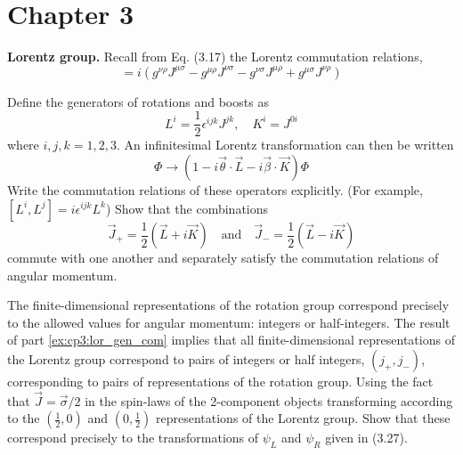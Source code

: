 \section{Chapter 3}

\setcounter{equation}{150}
\problem \textbf{Lorentz group.} Recall from Eq. (3.17) the Lorentz commutation relations,
\begin{equation*}
    [J^{\mu\nu}, J^{\rho\sigma}] = i(g^{\nu\rho}J^{\mu\sigma} - g^{\mu\rho}J^{\nu\sigma} - g^{\nu\sigma}J^{\mu\rho} + g^{\mu\sigma}J^{\nu\rho})
\end{equation*}
\begin{problembody}
    \item \label{ex:cp3:lor_gen_com} 
    Define the generators of rotations and boosts as
    \begin{equation*}
        L^i = \frac{1}{2}\epsilon^{ijk} J^{jk}, \quad K^i = J^{0i}
    \end{equation*}
    where $i, j, k = 1, 2, 3$. An infinitesimal Lorentz transformation can then be written
    \begin{equation}\label{equ:cp2:infsm_lor_trans}
        \Phi \to \left(1 - i\vec{\theta}\cdot\vec{L} - i\vec{\beta}\cdot\vec{K}\right)\Phi
    \end{equation}
    Write the commutation relations of these operators explicitly. (For example, $[L^i, L^j] = i\epsilon^{ijk}L^k$)
    Show that the combinations 
    \begin{equation*}
        \vec{J}_{+} = \frac{1}{2} \left(\vec{L} + i\vec{K}\right) \quad \text{and} 
        \quad \vec{J}_{-} = \frac{1}{2} \left(\vec{L} - i\vec{K}\right)
    \end{equation*} 
    commute with one another and separately satisfy the commutation relations of angular momentum.

    \item The finite-dimensional representations of the rotation group correspond precisely to the allowed values for 
    angular momentum: integers or half-integers. The result of part \ref{ex:cp3:lor_gen_com} implies that all finite-dimensional
    representations of the Lorentz group correspond to pairs of integers or half integers, $(j_+, j_-)$, corresponding to pairs 
    of representations of the rotation group. Using the fact that $\vec{J} = \vec{\sigma} / 2$ in the spin-laws of the 2-component
    objects transforming according to the $(\frac{1}{2}, 0)$ and $(0, \frac{1}{2})$ representations of the Lorentz group. Show 
    that these correspond precisely to the transformations of $\psi_L$ and $\psi_R$ given in (3.27).


\end{problembody}
